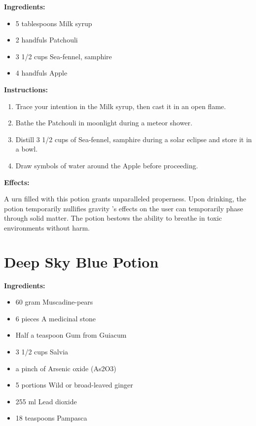 \documentclass{article}
\begin{document}
\textbf{Ingredients:}

\begin{itemize}
  \item 5 tablespoons Milk syrup
  \item 2 handfuls Patchouli
  \item 3 1/2 cups Sea-fennel, samphire
  \item 4 handfuls Apple
\end{itemize}

\textbf{Instructions:}

\begin{enumerate}
  \item Trace your intention in the Milk syrup, then cast it in an open flame.
  \item Bathe the Patchouli in moonlight during a meteor shower.
  \item Distill 3 1/2 cups of Sea-fennel, samphire during a solar eclipse and store it in a bowl.
  \item Draw symbols of water around the Apple before proceeding.
\end{enumerate}

\textbf{Effects:}

A urn filled with this potion grants unparalleled properness. Upon drinking, the potion temporarily nullifies gravity 's effects on the user can temporarily phase through solid matter. The potion bestows the ability to breathe in toxic environments without harm.

\newpage
\section*{Deep Sky Blue Potion}

\textbf{Ingredients:}

\begin{itemize}
  \item 60 gram Muscadine-pears
  \item 6 pieces A medicinal stone
  \item Half a teaspoon Gum from Guiacum
  \item 3 1/2 cups Salvia
  \item a pinch of Arsenic oxide (As2O3)
  \item 5 portions Wild or broad-leaved ginger
  \item 255 ml Lead dioxide
  \item 18 teaspoons Pampasca
\end{itemize}
\end{document}

